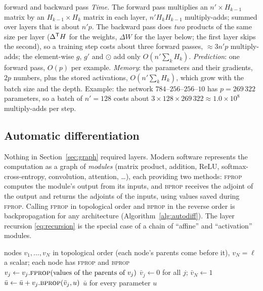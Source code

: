\documentclass[11pt]{article}
\begin{document}
\begin{runtime}{forward and backward pass}
\emph{Time.} The forward pass multiplies an $n' \times H_{k-1}$ matrix by an $H_{k-1} \times H_k$ matrix in each layer,
$n'H_kH_{k-1}$ multiply-adds; summed over layers that is about $n'p$. The backward pass does \emph{two} products of the same
size per layer ($\Delta^{\mathsf{T}} H$ for the weights, $\Delta W$ for the layer below; the first layer skips the second), so
a training step costs about three forward passes, $\approx 3n'p$ multiply-adds; the element-wise $g$, $g'$ and $\odot$ add only
$O(n'\sum_k H_k)$. \emph{Prediction}: one forward pass, $O(p)$ per example. \emph{Memory}: the parameters and their
gradients, $2p$ numbers, plus the stored activations, $O(n'\sum_k H_k)$, which grow with the batch size and the depth.
Example: the network $784$--$256$--$256$--$10$ has $p = 269\,322$ parameters, so a batch of $n' = 128$ costs about
$3 \times 128 \times 269\,322 \approx 1.0 \times 10^8$ multiply-adds per step.
\end{runtime}

\subsection{Automatic differentiation}\label{sec:autodiff}

Nothing in Section~\ref{sec:graph} required layers. Modern software represents the computation as a graph of
\emph{modules} (matrix product, addition, ReLU, softmax-cross-entropy, convolution, attention, \dots), each providing
two methods: \textsc{fprop} computes the module's output from its inputs, and \textsc{bprop} receives the adjoint of
the output and returns the adjoints of the inputs, using values saved during \textsc{fprop}. Calling \textsc{fprop} in
topological order and \textsc{bprop} in the reverse order is backpropagation for any architecture
(Algorithm~\ref{alg:autodiff}). The layer recursion \eqref{eq:recursion} is the special case of a chain of
``affine'' and ``activation'' modules.

\begin{algorithm}[H]
\caption{Reverse-mode automatic differentiation on a computational graph}\label{alg:autodiff}
\begin{algorithmic}[1]
\Require nodes $v_1, \dots, v_N$ in topological order (each node's parents come before it), $v_N = \ell$ a scalar;
  each node has \textsc{fprop} and \textsc{bprop}
    \State $v_j \gets v_j.\textsc{fprop}(\text{values of the parents of } v_j)$ 
  \EndFor
  \State $\bar{v}_j \gets 0$ for all $j$; \quad $\bar{v}_N \gets 1$
      \State $\bar{u} \gets \bar{u} + v_j.\textsc{bprop}(\bar{v}_j, u)$ 
    \EndFor
  \EndFor
  \State \Return $\bar{u}$ for every parameter $u$
\EndFunction
\end{algorithmic}
\end{algorithm}
\end{document}
